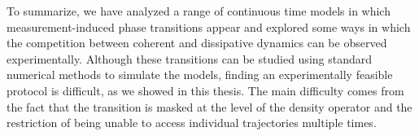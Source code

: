 To summarize, we have analyzed a range of continuous time models in which measurement-induced phase transitions appear and explored some ways in which the competition between coherent and dissipative dynamics can be observed experimentally. Although these transitions can be studied using standard numerical methods to simulate the models, finding an experimentally feasible protocol is difficult, as we showed in this thesis. The main difficulty comes from the fact that the transition is masked at the level of the density operator and the restriction of being unable to access individual trajectories multiple times. 